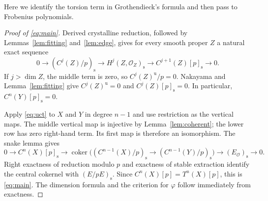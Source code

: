 \documentclass[11pt]{article}
\theoremstyle{remark}\newtheorem{remark}[theorem]{Remark}
\newcommand{\OO}{\mathcal O}
\newcommand{\st}{\mathrm{s}}
\newcommand{\uF}{\mathrm{u}}
\newcommand{\coker}{\operatorname{coker}}
\begin{document}
Here we identify the torsion term in Grothendieck's formula and then pass to Frobenius polynomials.

\begin{proof}[Proof of \eqref{eq:main}]
Derived crystalline reduction, followed by Lemmas~\ref{lem:fitting} and~\ref{lem:edge}, gives for every smooth proper $Z$ a natural exact sequence
\begin{equation}\label{eq:uct}
 0\longrightarrow(C^j(Z)/p)_{\st}
 \longrightarrow H^j(Z,\OO_Z)_{\st}
 \longrightarrow C^{j+1}(Z)[p]_{\st}\longrightarrow0.
\end{equation}
If $j>\dim Z$, the middle term is zero, so $C^j(Z)^{\uF}/p=0$. Nakayama and Lemma~\ref{lem:fitting} give $C^j(Z)^{\uF}=0$ and $C^j(Z)[p]_{\st}=0$. In particular, $C^n(Y)[p]_{\st}=0$.

Apply \eqref{eq:uct} to $X$ and $Y$ in degree $n-1$ and use restriction as the vertical maps. The middle vertical map is injective by Lemma~\ref{lem:coherent}; the lower row has zero right-hand term. Its first map is therefore an isomorphism. The snake lemma gives
\[
 0\longrightarrow C^n(X)[p]_{\st}
 \longrightarrow\coker\bigl((C^{n-1}(X)/p)_{\st}
                    \longrightarrow(C^{n-1}(Y)/p)_{\st}\bigr)
 \longrightarrow(E_{\OO})_{\st}\longrightarrow0.
\]
Right exactness of reduction modulo $p$ and exactness of stable extraction identify the central cokernel with $(E/pE)_{\st}$. Since $C^n(X)[p]=T^n(X)[p]$, this is \eqref{eq:main}. The dimension formula and the criterion for $\varphi$ follow immediately from exactness.
\end{proof}
\end{document}
